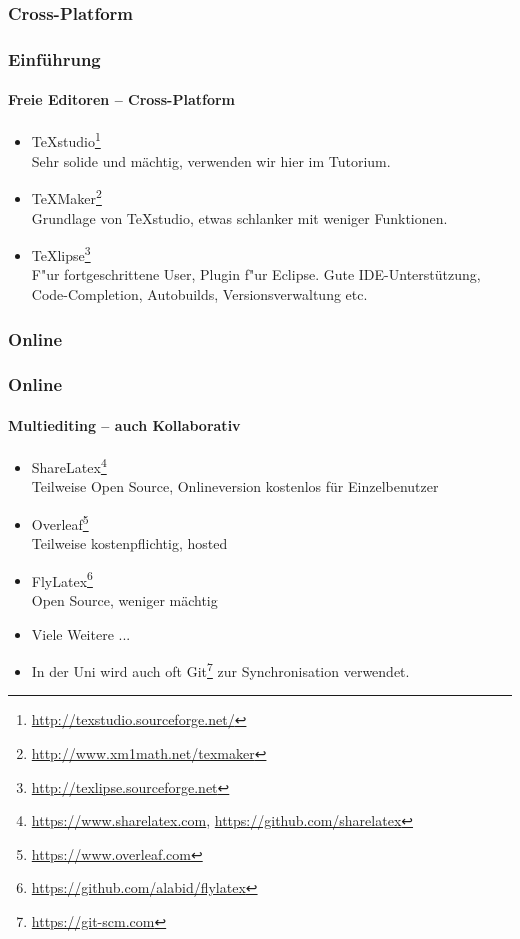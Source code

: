 \subsubsection{Cross-Platform}
\begin{frame}
\frametitle{Einf\"uhrung}
\framesubtitle{Freie Editoren -- Cross-Platform}
\begin{itemize}
  \item TeXstudio\footnote{\url{http://texstudio.sourceforge.net/}}\\
  Sehr solide und mächtig, verwenden wir hier im Tutorium.
  \item TeXMaker\footnote{\url{http://www.xm1math.net/texmaker}}\\
   Grundlage von TeXstudio, etwas schlanker mit weniger Funktionen.
  \item TeXlipse\footnote{\url{http://texlipse.sourceforge.net}}\\ F"ur fortgeschrittene User, Plugin f"ur
  Eclipse. Gute IDE-Unterst\"utzung, Code-Completion, Autobuilds, Versionsverwaltung etc.
\end{itemize}
\end{frame}


\subsubsection{Online}
\begin{frame}
\frametitle{Online}
\framesubtitle{Multiediting -- auch Kollaborativ}
\begin{itemize}
  \item ShareLatex\footnote{\url{https://www.sharelatex.com}, \url{https://github.com/sharelatex}}\\
  Teilweise Open Source, Onlineversion kostenlos für Einzelbenutzer
  \item Overleaf\footnote{\url{https://www.overleaf.com}}\\
  Teilweise kostenpflichtig, hosted
  \item FlyLatex\footnote{\url{https://github.com/alabid/flylatex}}\\ 
  Open Source, weniger mächtig
  \item Viele Weitere ...
  \vspace{7mm}
  \item In der Uni wird auch oft Git\footnote{\url{https://git-scm.com}} zur Synchronisation verwendet.
\end{itemize}
\end{frame}


